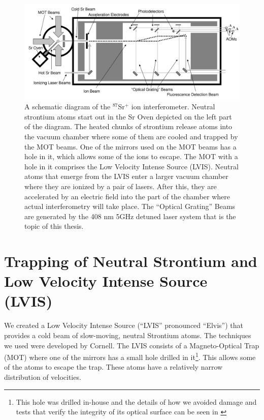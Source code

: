 \begin{figure}
\centerline{
\includegraphics[totalheight=0.3\textheight]{interferometer_diagram}
}
\caption[Ion Interferometer]{\label{fig:IonInterferometer}
A schematic diagram of the $^{87}$Sr$^+$ ion interferometer. Neutral strontium atoms start out in the Sr Oven depicted on the left part of the diagram. The heated chunks of strontium release atoms into the vacuum chamber where some of them are cooled and trapped by the MOT beams. One of the mirrors used on the MOT beams has a hole in it, which allows some of the ions to escape. The MOT with a hole in it comprises the Low Velocity Intense Source (LVIS). Neutral atoms that emerge from the LVIS enter a larger vacuum chamber where they are ionized by a pair of lasers. After this, they are accelerated by an electric field into the part of the chamber where actual interferometry will take place. The ``Optical Grating'' Beams are generated by the 408 nm 5GHz detuned laser system that is the topic of this thesis.} 
\end{figure}

\section{Trapping of Neutral Strontium and Low Velocity Intense Source (LVIS)}

We created a Low Velocity Intense Source (``LVIS'' pronounced ``Elvis'') \cite{cjeDiss} that provides a cold beam of slow-moving, neutral Strontium atoms. The techniques we used were developed by Cornell\cite{LVIS}. The LVIS consists of a Magneto-Optical Trap (MOT) where one of the mirrors has a small hole drilled in it\footnote{This hole was drilled in-house and the details of how we avoided damage and tests that verify the integrity of its optical surface can be seen in \cite{cjeDiss}}. This allows some of the atoms to escape the trap. These atoms have a relatively narrow distribution of velocities. %


